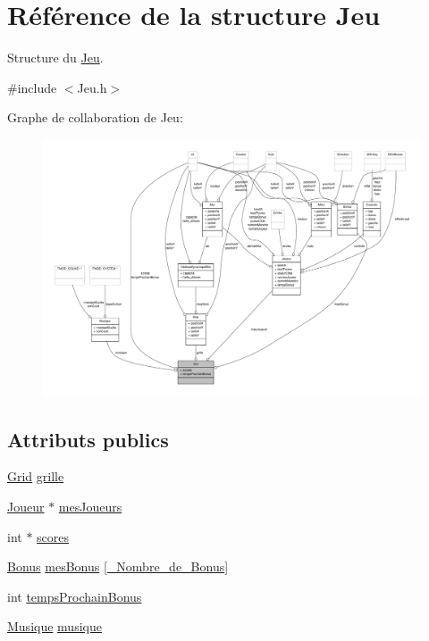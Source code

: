 \hypertarget{structJeu}{\section{Référence de la structure Jeu}
\label{structJeu}
}


Structure du \hyperlink{structJeu}{Jeu}.  




{\ttfamily \#include $<$Jeu.\-h$>$}



Graphe de collaboration de Jeu\-:\nopagebreak
\begin{figure}[H]
\begin{center}
\leavevmode
\includegraphics[width=350pt]{structJeu__coll__graph}
\end{center}
\end{figure}
\subsection*{Attributs publics}
\begin{DoxyCompactItemize}
\item 
\hyperlink{structGrid}{Grid} \hyperlink{structJeu_a004d8d0f888b9dea26cbbc2d6afea6e7}{grille}
\item 
\hyperlink{structJoueur}{Joueur} $\ast$ \hyperlink{structJeu_aafbe63ae87dd9d9b17e69ae94123ee31}{mes\-Joueurs}
\item 
int $\ast$ \hyperlink{structJeu_a3db4303dcbb7630f11d5bfdf4a7bf181}{scores}
\item 
\hyperlink{structBonus}{Bonus} \hyperlink{structJeu_a70bf0e19753aaa6cfba719388aae410d}{mes\-Bonus} \mbox{[}\hyperlink{Constantes_8h_af4e31715ab308023d6200e64b86b9946}{\-\_\-\-Nombre\-\_\-de\-\_\-\-Bonus}\mbox{]}
\item 
int \hyperlink{structJeu_a08a8620c89aa61ed6bbeb2dcf6c68a40}{temps\-Prochain\-Bonus}
\item 
\hyperlink{structMusique}{Musique} \hyperlink{structJeu_a254bcdad7f9995cb345b777980ffdbe0}{musique}
\end{DoxyCompactItemize}


